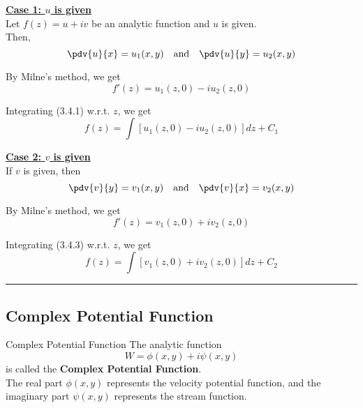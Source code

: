 \underline{\textbf{Case 1: $u$ is given}} \\
Let $f(z) = u + iv$ be an analytic function and $u$ is given. \\
Then, \[
    \pdv{u}{x} = u_1(x,y) \quad \text{and} \quad \pdv{u}{y} = u_2(x,y)
\] 

By Milne's method, we get
\begin{equation}
    f'(z) = u_1(z,0) - iu_2(z,0)
\end{equation} 

Integrating (3.4.1) w.r.t. $z$, we get
\begin{equation}
    f(z) = \int \left[ u_1(z,0) - iu_2(z,0) \right] dz + C_1
\end{equation}

\underline{\textbf{Case 2: $v$ is given}} \\
If $v$ is given, then \[
    \pdv{v}{y} = v_1(x,y) \quad \text{and} \quad \pdv{v}{x} = v_2(x,y)
\] 

By Milne's method, we get
\begin{equation}
    f'(z) = v_1(z,0) + iv_2(z,0)
\end{equation}

Integrating (3.4.3) w.r.t. $z$, we get
\begin{equation}
    f(z) = \int \left[ v_1(z,0) + iv_2(z,0) \right] dz + C_2
\end{equation}

\vspace{20pt}\rule{3in}{1pt}


\subsection{Complex Potential Function}
\begin{definition}{Complex Potential Function}{}
    The analytic function  \[
        W = \phi(x,y) + i\psi(x,y)
    \] is called the \textbf{Complex Potential Function}. \\
    The real part $\phi(x,y)$ represents the velocity potential function, and the imaginary part $\psi(x,y)$ represents the stream function.
\end{definition}

